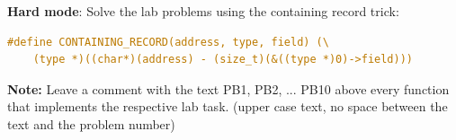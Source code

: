 \documentclass{exam}
\begin{document}
\bigskip
\noindent\textbf{Hard mode}: Solve the lab problems using the containing record trick:
\begin{lstlisting}[language=C]
#define CONTAINING_RECORD(address, type, field) (\
    (type *)((char*)(address) - (size_t)(&((type *)0)->field)))
\end{lstlisting}
\textbf{Note:} Leave a comment with the text PB1, PB2, ... PB10 above every function that implements the respective lab task. (upper case text, no space between the text and the problem number)

\medskip
\printbibliography
\end{document}
